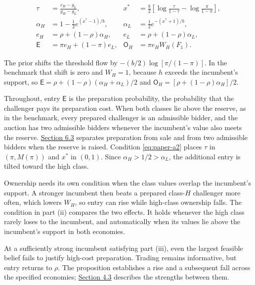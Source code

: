 \[
\begin{aligned}
\tau&=\frac{c_H-g_L}{g_H-g_L},&
x^*&=\frac b2\left[\log\frac\tau{1-\tau}-\log\frac\pi{1-\pi}\right],\\
\alpha_H&=1-\frac12e^{(x^*-1)/b},&
\alpha_L&=\frac12e^{-(x^*+1)/b},\\
e_H&=\rho+(1-\rho)\alpha_H,&
e_L&=\rho+(1-\rho)\alpha_L,\\
\mathsf E&=\pi e_H+(1-\pi)e_L,&
\mathsf O_H&=\pi e_HW_H(F_1).
\end{aligned}
\tag{12}\label{eq:paper-12}
\]

The prior shifts the threshold flow by \(-(b/2)\log[\pi/(1-\pi)]\). In
the benchmark that shift is zero and \(W_H=1\), because \(h\) exceeds
the incumbent's support, so
\(\mathsf E=\rho+(1-\rho)(\alpha_H+\alpha_L)/2\) and
\(\mathsf O_H=[\rho+(1-\rho)\alpha_H]/2\).

Throughout, entry \(\mathsf E\) is the preparation probability, the
probability that the challenger pays its preparation cost. When both
classes lie above the reserve, as in the benchmark, every prepared
challenger is an admissible bidder, and the auction has two admissible
bidders whenever the incumbent's value also meets the reserve.
\hyperref[sec-design]{Section 6.3} separates preparation from sale and
from two admissible bidders when the reserve is raised. Condition
\eqref{eq:paper-a2} places \(\tau\) in \((\pi,M(\pi))\) and \(x^*\) in
\((0,1)\). Since \(\alpha_H>1/2>\alpha_L\), the additional entry is
tilted toward the high class.

Ownership needs its own condition when the class values overlap the
incumbent's support. A stronger incumbent then beats a prepared
class-\(H\) challenger more often, which lowers \(W_H\), so entry can
rise while high-class ownership falls. The condition in part (ii)
compares the two effects. It holds whenever the high class rarely loses
to the incumbent, and automatically when its values lie above the
incumbent's support in both economies.

At a sufficiently strong incumbent satisfying part (iii), even the
largest feasible belief fails to justify high-cost preparation. Trading
remains informative, but entry returns to \(\rho\). The proposition establishes a rise and a subsequent fall across the specified economies; \hyperref[sec-coexistence-and-the-equilibrium-correspondence]{Section 4.3} describes the strengths between them.
